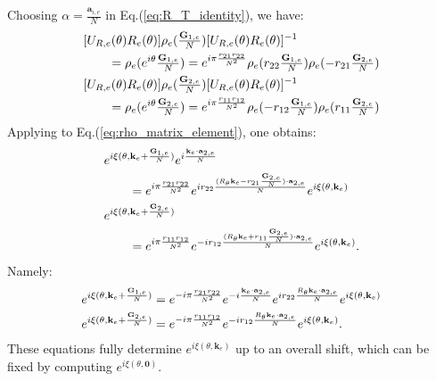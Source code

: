 \begin{subappendices}
Choosing $\alpha=\frac{\mathbf a_{i,e}}{N}$ in Eq.(\ref{eq:R_T_identity}), we have:
\begin{align}
&[U_{R,e}(\theta)R_e(\theta)]\rho_e(\tfrac{\mathbf G_{1,e}}{N})[U_{R,e}(\theta)R_e(\theta)]^{-1}\notag\\
&\quad\quad=\rho_e(e^{i\theta}\tfrac{\mathbf G_{1,e}}{N})=e^{i\pi\frac{r_{21}r_{22}}{N^2}}\rho_e(r_{22}\tfrac{\mathbf G_{1,e}}{N})\rho_e(-r_{21}\tfrac{\mathbf G_{2,e}}{N})\notag\\
&[U_{R,e}(\theta)R_e(\theta)]\rho_e(\tfrac{\mathbf G_{2,e}}{N})[U_{R,e}(\theta)R_e(\theta)]^{-1}\notag\\
&\quad\quad=\rho_e(e^{i\theta}\tfrac{\mathbf G_{2,e}}{N})=e^{i\pi\frac{r_{11}r_{12}}{N^2}}\rho_e(-r_{12}\tfrac{\mathbf G_{1,e}}{N})\rho_e(r_{11}\tfrac{\mathbf G_{2,e}}{N})
\end{align}
Applying to Eq.(\ref{eq:rho_matrix_element}), one obtains:
\begin{align}
&e^{i\xi(\theta,\mathbf k_e+\frac{\mathbf G_{1,e}}{N})} e^{i\frac{\mathbf k_e\cdot\mathbf a_{2,e}}{N}}\notag\\
&\qquad=e^{i\pi\frac{r_{21}r_{22}}{N^2}}e^{ir_{22}\frac{(R_{\theta}\mathbf k_e-r_{21}\frac{\mathbf G_{2,e}}{N})\cdot\mathbf a_{2,e}}{N}}e^{i\xi(\theta,\mathbf k_e)}\notag\\
&e^{i\xi(\theta,\mathbf k_e+\frac{\mathbf G_{2,e}}{N})}\notag\\
&\qquad=e^{i\pi\frac{r_{11}r_{12}}{N^2}}e^{-ir_{12}\frac{(R_{\theta}\mathbf k_e+r_{11}\frac{\mathbf G_{2,e}}{N})\cdot\mathbf a_{2,e}}{N}}e^{i\xi(\theta,\mathbf k_e)}.
\end{align}
Namely:
\begin{align}
e^{i\xi(\theta,\mathbf k_e+\frac{\mathbf G_{1,e}}{N})}&=e^{-i\pi\frac{r_{21}r_{22}}{N^2}}e^{-i\frac{\mathbf k_e\cdot\mathbf a_{2,e}}{N}}e^{ir_{22}\frac{R_{\theta}\mathbf k_e\cdot\mathbf a_{2,e}}{N}}e^{i\xi(\theta,\mathbf k_e)}\notag\\
e^{i\xi(\theta,\mathbf k_e+\frac{\mathbf G_{2,e}}{N})}&=e^{-i\pi\frac{r_{11}r_{12}}{N^2}}e^{-ir_{12}\frac{R_{\theta}\mathbf k_e\cdot\mathbf a_{2,e}}{N}}e^{i\xi(\theta,\mathbf k_e)}.
\end{align}
These equations fully determine $e^{i\xi(\theta,\mathbf k_e)}$ up to an overall shift, which can be fixed by computing $e^{i\xi(\theta,\mathbf 0)}$. 


\end{subappendices}
